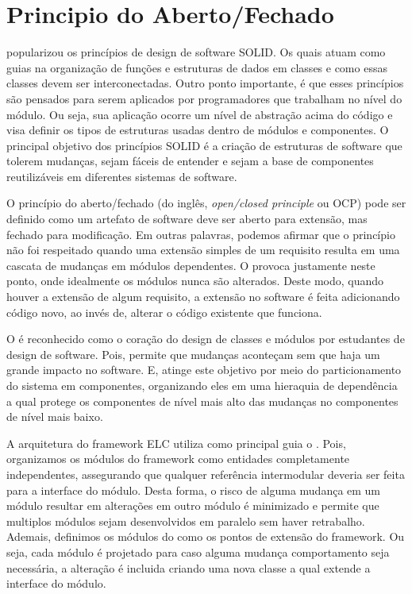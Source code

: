 \documentclass[12pt]{tcc}
\begin{document}
	\section{Principio do Aberto/Fechado}
	\label{cap:solid-ocp}
	\citet{MartinCleanArchtecture2017} popularizou os princípios de design de software SOLID.
	Os quais atuam como guias na organização de funções e estruturas de dados em classes e como essas classes devem ser interconectadas.
	Outro ponto importante, é que esses princípios são pensados para serem aplicados por programadores que trabalham no nível do módulo.
	Ou seja, sua aplicação ocorre um nível de abstração acima do código e visa definir os tipos de estruturas usadas dentro de módulos e componentes.
	O principal objetivo dos princípios SOLID é a criação de estruturas de software que tolerem mudanças, sejam fáceis de entender e sejam a base de componentes reutilizáveis em diferentes sistemas de software.

	O princípio do aberto/fechado (do inglês, \emph{open/closed principle} ou OCP) pode ser definido como um artefato de software deve ser aberto para extensão, mas fechado para modificação. \citep{Meyer1997ObjectOrientedSoftwareConstruction}
	Em outras palavras, podemos afirmar que o princípio não foi respeitado quando uma extensão simples de um requisito resulta em uma cascata de mudanças em módulos dependentes.
	O  provoca justamente neste ponto, onde idealmente os módulos nunca são alterados.
	Deste modo, quando houver a extensão de algum requisito, a extensão no software é feita adicionando código novo, ao invés de, alterar o código existente que funciona. \citep{Martin2000TheOP}

	O  é reconhecido como o coração do design de classes e módulos por estudantes de design de software. \citep{MartinCleanArchtecture2017}
	Pois, permite que mudanças aconteçam sem que haja um grande impacto no software.
	E, atinge este objetivo por meio do particionamento do sistema em componentes, organizando eles em uma hieraquia de dependência a qual protege os componentes de nível mais alto das mudanças no componentes de nível mais baixo. \citep{MartinCleanArchtecture2017}

	A arquitetura do framework ELC utiliza como principal guia o .
	Pois, organizamos os módulos do framework como entidades completamente independentes, assegurando que qualquer referência intermodular deveria ser feita para a interface do módulo.
	Desta forma, o risco de alguma mudança em um módulo resultar em alterações em outro módulo é minimizado e permite que multiplos módulos sejam desenvolvidos em paralelo sem haver retrabalho.
	Ademais, definimos os módulos do  como os pontos de extensão do framework.
	Ou seja, cada módulo é projetado para caso alguma mudança comportamento seja necessária, a alteração é incluida criando uma nova classe a qual extende a interface do módulo.
\end{document}
